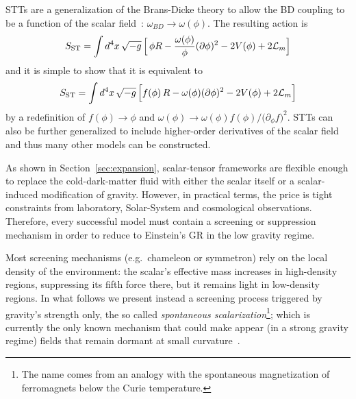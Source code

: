 STTs are a generalization of the Brans-Dicke theory to allow the BD coupling to be a function of the scalar field~\cite{Quiros:2019ktw}: $\omega_{BD} \rightarrow \omega(\phi)$. The resulting action is
\begin{equation}
    S_{\text{ST}} = \int d^{4}x\,\sqrt{-g}\,\Bigl[\,\phi R - \frac{\omega(\phi)}{\phi}(\partial\phi)^{2} - 2V(\phi) + 2\mathcal{L}_{m}\Bigr]
\end{equation}
and it is simple to show that it is equivalent to 
\begin{equation}
S_{\text{ST}} = \int d^{4}x\,\sqrt{-g}\,\Bigl[f(\phi)\,R - \omega(\phi)(\partial\phi)^{2} - 2V(\phi) + 2\mathcal{L}_{m}\Bigr]
\end{equation}
by a redefinition of $f(\phi) \rightarrow \phi$ and $\omega(\phi) \rightarrow  \omega(\phi)f(\phi)/\bigl(\partial_{\phi}f\bigr)^{2}$.
STTs can also be further generalized to include higher-order derivatives of the scalar field and thus many other models can be constructed. 

As shown in Section~\ref{sec:expansion}, scalar-tensor frameworks are flexible enough to replace the cold-dark-matter fluid with either the scalar itself or a scalar-induced modification of gravity. 
However, in practical terms, the price is tight constraints from laboratory, Solar-System and cosmological observations. Therefore, every successful model must contain a screening or suppression mechanism in order to reduce to Einstein's GR in the low gravity regime. 

Most screening mechanisms (e.g.\ chameleon or symmetron) rely on the local density of the environment: the scalar's effective mass increases in high-density regions, suppressing its fifth force there, but it remains light in low-density regions.
In what follows we present instead a screening process triggered by gravity's strength only, the so called \textit{spontaneous scalarization}\footnote{The name comes from an analogy with the spontaneous magnetization of ferromagnets below the Curie temperature.}; which is currently the only
known mechanism that could make appear (in a strong gravity regime) fields that remain dormant at small curvature~\cite{Doneva_2024}.

